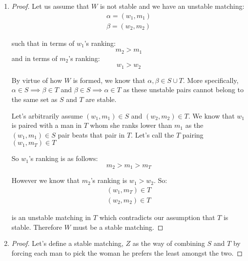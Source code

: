 \documentclass{article}
\begin{document}
\begin{enumerate}[label=(\alph*)]
    \item \begin{proof}
        Let us assume that \(W\) is not stable and we have an unstable matching: 
        \begin{align*}
            \alpha = (w_1, m_1) \\
            \beta = (w_2, m_2)
        \end{align*}

        such that in terms of \(w_1\)'s ranking: \\
        \begin{displaymath}
            m_2 > m_1
        \end{displaymath}
         and in terms of \(m_2\)'s ranking: 
         \begin{displaymath}
            w_1 > w_2
         \end{displaymath}

         By virtue of how \(W\) is formed, we know that \(\alpha, \beta \in S \cup T\). More specifically, \(\alpha \in S \implies \beta \in T\)
         and \(\beta \in S \implies \alpha \in T\) as these unstable pairs cannot belong to the same set as \(S\) and \(T\) are stable.

         Let's arbitrarily assume \((w_1, m_1) \in S\) and \((w_2, m_2) \in T\). 
         We know that \(w_1\) is paired with a man in \(T\) whom she ranks lower than \(m_1\) as the \((w_1, m_1) \in S\) pair beats that pair in \(T\).
         Let's call the \(T\) pairing \((w_1, m_T) \in T\)

         So \(w_1\)'s ranking is as follows:
         \begin{displaymath}
             m_2 > m_1 > m_T
         \end{displaymath}

         However we know that \(m_2\)'s ranking is \(w_1 > w_2\). So:
         \begin{align*}
             (w_1, m_T) \in T \\
             (w_2, m_2) \in T
         \end{align*}

         is an unstable matching in \(T\) which contradicts our assumption that \(T\) is stable.
         Therefore \(W\) must be a stable matching.
    \end{proof}

    \item \begin{proof}
        Let's define a stable matching, \(Z\) as the way of combining \(S\) and \(T\) by forcing each man to pick 
        the woman he prefers the least amongst the two.


\end{proof}
\end{enumerate}
\end{document}
